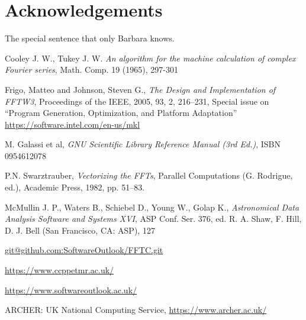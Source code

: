 \documentclass[12pt, a4paper]{article}
\begin{document}
\section{Acknowledgements}
The special sentence that only Barbara knows.
\begin{thebibliography}{9}

Cooley J. W., Tukey J. W.
{\it An algorithm for the machine calculation of complex Fourier series},
Math. Comp. 19 (1965), 297-301
 
Frigo, Matteo and Johnson, Steven G.,
{\it The Design and Implementation of FFTW3},
Proceedings of the IEEE,
2005,
93,
2,
216--231,
Special issue on ``Program Generation, Optimization, and Platform Adaptation''
\hyperlink{https://software.intel.com/en-us/mkl}{https://software.intel.com/en-us/mkl}

M. Galassi et al, {\it GNU Scientific Library Reference Manual (3rd Ed.)}, ISBN 0954612078
  
P.N. Swarztrauber, {\it Vectorizing the FFTs}, Parallel Computations (G. Rodrigue, ed.), Academic Press, 1982, pp. 51--83.
  
McMullin J. P., Waters B., Schiebel D., Young W., Golap K.,
{\it Astronomical Data Analysis Software and Systems XVI},
ASP Conf. Ser. 376, ed. R. A. Shaw, F. Hill, D. J. Bell (San Francisco, CA: ASP), 127

\hyperlink{git@github.com:SoftwareOutlook/FFTC.git}{git@github.com:SoftwareOutlook/FFTC.git}
    
\hyperlink{https://www.ccppetmr.ac.uk/}{https://www.ccppetmr.ac.uk/}

\hyperlink{https://www.softwareoutlook.ac.uk/}{https://www.softwareoutlook.ac.uk/}

ARCHER: UK National Computing Service, \hyperlink{https://www.archer.ac.uk/}{https://www.archer.ac.uk/}
  
\end{thebibliography}
\end{document}
